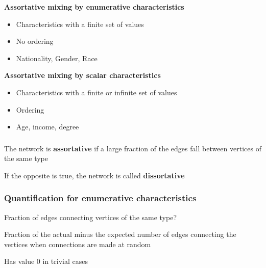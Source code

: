 \documentclass{beamer}
\begin{document}
\begin{frame}
    \centering
        \vspace{2em}
    {\bf Assortative mixing by enumerative characteristics}

        \vspace{1em}
        \begin{itemize}
        \setlength\itemsep{1em}
            \item{Characteristics with a finite set of values} 
            \item{No ordering} 
            \item{Nationality, Gender, Race} 
        \end{itemize}
        \vspace{1em}
    {\bf Assortative mixing by scalar characteristics}
        \vspace{1em}
        \begin{itemize}
        \setlength\itemsep{1em}
            \item{Characteristics with a finite or infinite set of values}
            \item{Ordering}
            \item{Age, income, degree}
        \end{itemize}
        \pause
\end{frame}
\begin{frame}
    \frametitle{}
    \centering
        \vspace{1em}
        The network is {\bf assortative} if a large fraction of the edges fall between vertices of the same type

        \vspace{1em}
        If the opposite is true, the network is called {\bf dissortative}
\end{frame}
\begin{frame}
    \frametitle{Quantification for enumerative characteristics}
        
    \begin{itemize}
    \setlength\itemsep{2em}
        \pause
        \item{Fraction of edges connecting vertices of the same type?}
        
        \pause
        \item{Fraction of the actual minus the expected number of edges connecting the vertices when connections are made at random\\

        \pause
        \item{Has value $0$ in trivial cases}
}
    \end{itemize}
\end{frame}
\end{document}
